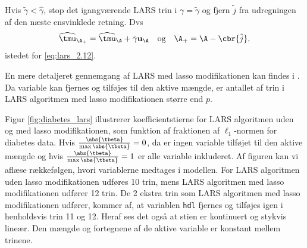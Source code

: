%
Hvis \(\tilde{\gamma} < \widehat{\gamma}\), stop det igangværende LARS trin i \(\gamma = \tilde{\gamma}\) og fjern \(\tilde{j}\) fra udregningen af den næste ensvinklede retning.
Dvs
\begin{align*}
\widehat{\tmu}_{\A_+} = \widehat{\tmu}_\A + \tilde{\gamma} \mathbf{u}_\A \quad \text{og} \quad \A_+ = \A - \cbr{\tilde{j}},
\end{align*}
istedet for \eqref{eq:lars_2.12}.

En mere detaljeret gennemgang af LARS med lasso modifikationen kan findes i \citep{efron}.
Da variable kan fjernes og tilføjes til den aktive mængde, er antallet af trin i LARS algoritmen med lasso modifikationen større end \(p\).

\begin{eks}
Figur \ref{fig:diabetes_lars} illustrerer koefficientstierne for LARS algoritmen uden og med lasso modifikationen, som funktion af fraktionen af \(\ell_1\)-normen for diabetes data.
Hvis \(\frac{\abs{\tbeta}}{\max \abs{\tbeta}} = 0\), da er ingen variable tilføjet til den aktive mængde og hvis \(\frac{\abs{\tbeta}}{\max \abs{\tbeta}} = 1\) er alle variable inkluderet.
Af figuren kan vi aflæse rækkefølgen, hvori variablerne medtages i modellen.
For LARS algoritmen uden lasso modifikationen udføres 10 trin, mens LARS algoritmen med lasso modifikationen udfører 12 trin.
De 2 ekstra trin som LARS algoritmen med lasso modifikationen udfører, kommer af, at variablen \texttt{hdl} fjernes og tilføjes igen i henholdsvis trin 11 og 12.
Heraf ses det også at stien er kontinuert og stykvis lineær.
Den mængde og fortegnene af de aktive variable er konstant mellem trinene.

\end{eks}





